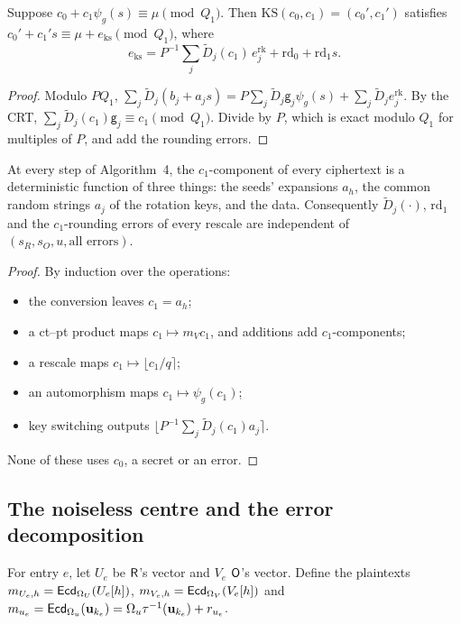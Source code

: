 \begin{lemma}\label{lem:ks}
Suppose $c_0+c_1\psi_g(s)\equiv\mu\pmod{Q_1}$. Then $\mathrm{KS}(c_0,c_1)=(c_0',c_1')$ satisfies $c_0'+c_1's\equiv\mu+e_{\mathrm{ks}}\pmod{Q_1}$, where
\[
  e_{\mathrm{ks}}=P^{-1}\sum_j\tilde D_j(c_1)\,e^{\mathrm{rk}}_j+\mathrm{rd}_0+\mathrm{rd}_1s .
\]
\end{lemma}
\begin{proof}
Modulo $PQ_1$, $\sum_j\tilde D_j(b_j+a_js)=P\sum_j\tilde D_j\mathsf g_j\psi_g(s)+\sum_j\tilde D_je^{\mathrm{rk}}_j$. By the CRT, $\sum_j\tilde D_j(c_1)\mathsf g_j\equiv c_1\pmod{Q_1}$. Divide by $P$, which is exact modulo $Q_1$ for multiples of $P$, and add the rounding errors.
\end{proof}

\begin{lemma}\label{lem:c1indep}
At every step of Algorithm~4, the $c_1$-component of every ciphertext is a deterministic function of three things: the seeds' expansions $a_h$, the common random strings $a_j$ of the rotation keys, and the data. Consequently $\tilde D_j(\cdot)$, $\mathrm{rd}_1$ and the $c_1$-rounding errors of every rescale are independent of $(s_R,s_O,u,\text{all errors})$.
\end{lemma}
\begin{proof}
By induction over the operations:
\begin{itemize}[nosep]
  \item the conversion leaves $c_1=a_h$;
  \item a ct--pt product maps $c_1\mapsto m_Vc_1$, and additions add $c_1$-components;
  \item a rescale maps $c_1\mapsto\lfloor c_1/q\rceil$;
  \item an automorphism maps $c_1\mapsto\psi_g(c_1)$;
  \item key switching outputs $\lfloor P^{-1}\sum_j\tilde D_j(c_1)a_j\rceil$.
\end{itemize}
None of these uses $c_0$, a secret or an error.
\end{proof}

\subsection{The noiseless centre and the error decomposition}

For entry $e$, let $U_e$ be $\mathsf{R}$'s vector and $V_e$ $\mathsf{O}$'s vector. Define the plaintexts $m_{U_e,h}=\mathsf{Ecd}_{\Omega_U}(U_e[h])$, $m_{V_e,h}=\mathsf{Ecd}_{\Omega_V}(V_e[h])$ and $m_{u_e}=\mathsf{Ecd}_{\Omega_u}(\mathbf u_{k_e})=\Omega_u\tau^{-1}(\mathbf u_{k_e})+r_{u_e}$.

